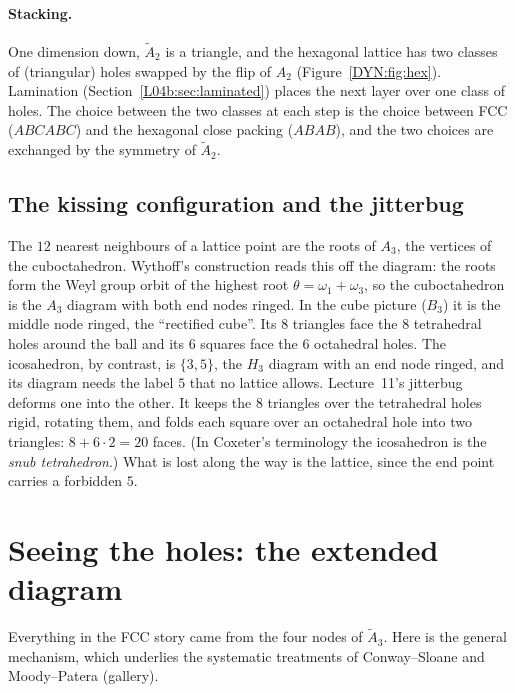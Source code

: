 \paragraph{Stacking.} One dimension down, $\tilde A_2$ is a triangle, and the hexagonal lattice has two
classes of (triangular) holes swapped by the flip of $A_2$ (Figure~\ref{DYN:fig:hex}). Lamination
(Section~\ref{L04b:sec:laminated}) places the next layer over one class of holes. The choice between the two
classes at each step is the choice between FCC ($ABCABC$) and the hexagonal close packing ($ABAB$),
and the two choices are exchanged by the symmetry of $\tilde A_2$.

\subsection*{The kissing configuration and the jitterbug}
The $12$ nearest neighbours of a lattice point are the roots of $A_3$, the vertices of the
cuboctahedron. Wythoff's construction reads this off the diagram: the roots form the Weyl group orbit
of the highest root $\theta=\omega_1+\omega_3$, so the cuboctahedron is the $A_3$ diagram with both
end nodes ringed. In the cube picture ($B_3$) it is the middle node ringed, the ``rectified cube''. Its
$8$ triangles face the $8$ tetrahedral holes around the ball and its $6$ squares face the $6$ octahedral
holes. The icosahedron, by contrast, is $\{3,5\}$, the $H_3$ diagram with an end node ringed, and its
diagram needs the label $5$ that no lattice allows. Lecture~11's jitterbug deforms one into the other. It
keeps the $8$ triangles over the tetrahedral holes rigid, rotating them, and folds each square over an
octahedral hole into two triangles: $8+6\cdot2=20$ faces. (In Coxeter's terminology the icosahedron is the
\emph{snub tetrahedron}.) What is lost along the way is the
lattice, since the end point carries a forbidden $5$.

\section{Seeing the holes: the extended diagram}
\label{DYN:sec:holes}

Everything in the FCC story came from the four nodes of $\tilde A_3$. Here is the general mechanism,
which underlies the systematic treatments of Conway--Sloane and Moody--Patera (gallery).

